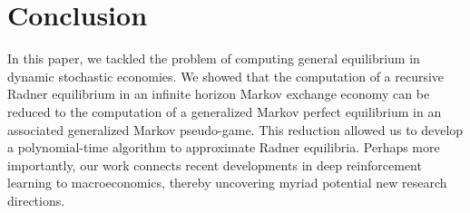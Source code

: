 \section{Conclusion}
\label{sec:conc}

In this paper, we tackled the problem of computing general equilibrium in dynamic stochastic economies. 
We showed that the computation of a recursive Radner equilibrium in an infinite horizon Markov exchange economy can be reduced to the computation of a generalized Markov perfect equilibrium in an associated generalized Markov pseudo-game.
This reduction allowed us to develop a polynomial-time algorithm to approximate  Radner equilibria. 
Perhaps more importantly, our work connects recent developments in deep reinforcement learning to macroeconomics, thereby uncovering myriad potential new research directions.
